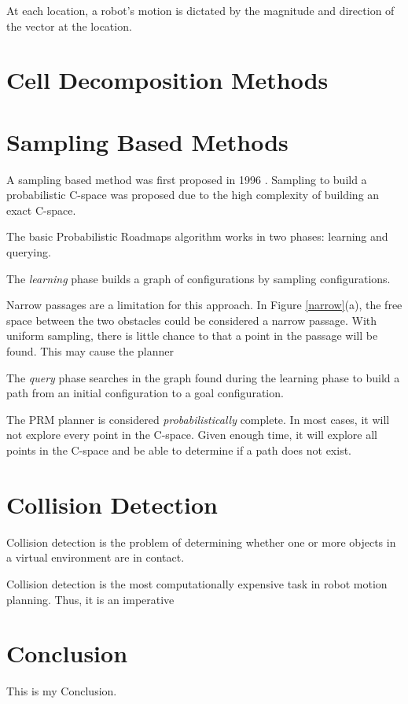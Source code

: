 \documentclass[10pt,conference]{ieeeconf}
\begin{document}
At each location, a robot's motion is dictated by the magnitude and direction of the vector at the location.

\section{Cell Decomposition Methods}
	
	
\section{Sampling Based Methods}

A sampling based method was first proposed in 1996 \cite{PRM}. Sampling to build a probabilistic C-space was proposed due to the high complexity of building an exact C-space.

The basic Probabilistic Roadmaps algorithm works in two phases: learning and querying. 

The \emph{learning} phase builds a graph of configurations by sampling configurations.

Narrow passages are a limitation for this approach. In Figure \ref{narrow}(a), the free space between the two obstacles could be considered a narrow passage. With uniform sampling, there is little chance to that a point in the passage will be found. This may cause the planner  

The \emph{query} phase searches in the graph found during the learning phase to build a path from an initial configuration to a goal configuration. 

The PRM planner is considered \emph{probabilistically} complete. In most cases, it will not explore every point in the C-space. Given enough time, it will explore all points in the C-space and be able to determine if a path does not exist. 




\section{Collision Detection}
	
	Collision detection is the problem of determining whether one or more objects in a virtual environment are in contact. 
	
	Collision detection is the most computationally expensive task in robot motion planning. Thus, it is an imperative 



\section{Conclusion}
    This is my Conclusion.




\end{document}
